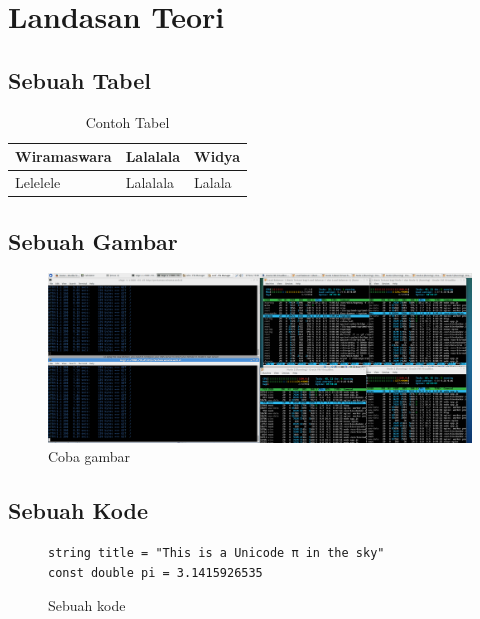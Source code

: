 \chapter{Landasan Teori}
    \section{Sebuah Tabel}
        \Blindtext[1][1]
        \begin{table}[h]
            \centering
            \caption{Contoh Tabel}
            \begin{tabular}{|l|l|l|}
                \hline
                Wiramaswara & Lalalala & Widya  \\ \hline
                Lelelele    & Lalalala & Lalala \\ \hline
            \end{tabular}
        \end{table}
        \Blindtext[1][1]
    \section{Sebuah Gambar}
        \Blindtext[1][1]
        \begin{figure}[h]
            \centering
            \includegraphics[width=1\textwidth]{tes.png}
            \caption{Coba gambar}
            \label{fig:testGambar}
        \end{figure}
    \section{Sebuah Kode}
        \begin{figure}[h]
            \begin{verbatim}
string title = "This is a Unicode π in the sky"
const double pi = 3.1415926535
            \end{verbatim}
            \caption{Sebuah kode}
        \end{figure}
    \cleardoublepage
